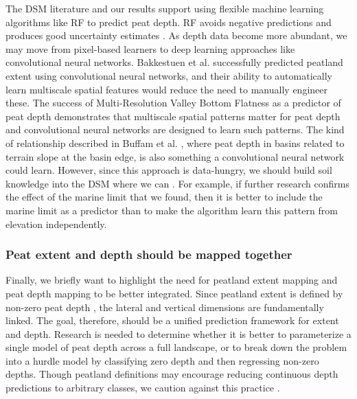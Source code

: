 \documentclass[soil, manuscript]{copernicus}
\begin{document}
The DSM literature and our results support using flexible machine learning algorithms like RF to predict peat depth.
RF avoids negative predictions \citep[c.f.][]{kogantiMappingPeatDepth2023} and produces good uncertainty estimates \citep[our study,][]{vaysseUsingQuantileRegression2017, takoutsingComparingPredictionPerformance2022}.
As depth data become more abundant, we may move from pixel-based learners to deep learning approaches like convolutional neural networks.
Bakkestuen et al. \citeyearpar{bakkestuenDelineationWetlandAreas2023} successfully predicted peatland extent using convolutional neural networks, and their ability to automatically learn multiscale spatial features would reduce the need to manually engineer these.
The success of Multi-Resolution Valley Bottom Flatness as a predictor of peat depth demonstrates that multiscale spatial patterns matter for peat depth and convolutional neural networks are designed to learn such patterns.
The kind of relationship described in Buffam et al. \citeyearpar{buffamFillingHolesRegional2010}, where peat depth in basins related to terrain slope at the basin edge, is also something a convolutional neural network could learn.
However, since this approach is data-hungry, we should build soil knowledge into the DSM where we can \citep{minasnySoilScienceInformedMachine2024}.
For example, if further research confirms the effect of the marine limit that we found, then it is better to include the marine limit as a predictor than to make the algorithm learn this pattern from elevation independently.

\subsubsection{Peat extent and depth should be mapped together}

Finally, we briefly want to highlight the need for peatland extent mapping and peat depth mapping to be better integrated.
Since peatland extent is defined by non-zero peat depth \citep[the specific threshold varies by definition,][]{minasnyMappingMonitoringPeatland2024}, the lateral and vertical dimensions are fundamentally linked.
The goal, therefore, should be a unified prediction framework for extent and depth.
Research is needed to determine whether it is better to parameterize a single model of peat depth across a full landscape, or to break down the problem into a hurdle model by classifying zero depth and then regressing non-zero depths.
Though peatland definitions may encourage reducing continuous depth predictions to arbitrary classes, we caution against this practice \citep[as in][]{ivanovsModelingGeospatialDistribution2024, karjalainenComparisonTwoGammaray2025}.
\end{document}
